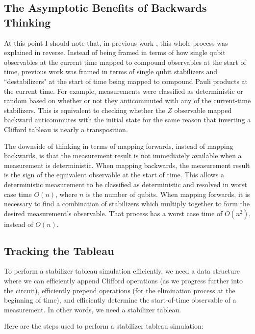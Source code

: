 \documentclass[onecolumn,unpublished]{quantumarticle}
\theoremstyle{definition}
\theoremstyle{definition}
\theoremstyle{definition}
\begin{document}
\subsection{The Asymptotic Benefits of Backwards Thinking}

At this point I should note that, in previous work \cite{aaronson2004chp}, this whole process was explained in reverse.
Instead of being framed in terms of how single qubit observables at the current time mapped to compound observables at the start of time, previous work was framed in terms of single qubit stabilizers and ``destabilizers" at the start of time being mapped to compound Pauli products at the current time.
For example, measurements were classified as deterministic or random based on whether or not they anticommuted with any of the current-time stabilizers.
This is equivalent to checking whether the $Z$ observable mapped backward anticommutes with the initial state for the same reason that inverting a Clifford tableau is nearly a transposition.

The downside of thinking in terms of mapping forwards, instead of mapping backwards, is that the measurement result is not immediately available when a measurement is deterministic.
When mapping backwards, the measurement result is the sign of the equivalent observable at the start of time.
This allows a deterministic measurement to be classified as deterministic and resolved in worst case time $O(n)$, where $n$ is the number of qubits.
When mapping forwards, it is necessary to find a combination of stabilizers which multiply together to form the desired measurement's observable.
That process has a worst case time of $O(n^2)$, instead of $O(n)$.

\subsection{Tracking the Tableau}

To perform a stabilizer tableau simulation efficiently, we need a data structure where we can efficiently append Clifford operations (as we progress further into the circuit), efficiently prepend operations (for the elimination process at the beginning of time), and efficiently determine the start-of-time observable of a measurement.
In other words, we need a stabilizer tableau.

Here are the steps used to perform a stabilizer tableau simulation:
\end{document}
